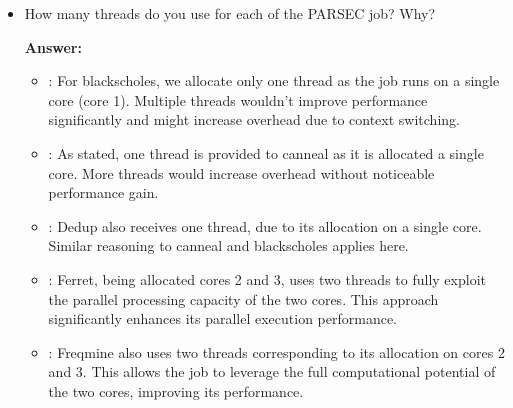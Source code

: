 \begin{enumerate}
\begin{itemize}
\begin{itemize}
        \item {}: Radix is assigned to cores 2 and 3, before ferret and freqmine started. Radix was observed to have a good response to parallelism and to be really fast. Additionally, ferret and freqmine run in around 10 minutes total. Thus, there was some time available once they had finished to run one of the other jobs. These times matched more closely to the execution time of radix.
        
        \item {}: Like blackscholes, canneal, and dedup, vips is allocated to core 1 sequentially. As an image processing system, vips requires high computational resources, but according to the analysis in Part 1-2 is less intensive than ferret or freqmine and, therefore, is allocated only one core.
 
    \end{itemize}


    \item How many threads do you use for each of the PARSEC job? Why?
    
    \textbf{Answer:}
    \begin{itemize}
        \item {}: For blackscholes, we allocate only one thread as the job runs on a single core (core 1). Multiple threads wouldn't improve performance significantly and might increase overhead due to context switching.
        
        \item {}: As stated, one thread is provided to canneal as it is allocated a single core. More threads would increase overhead without noticeable performance gain.
        
        \item {}: Dedup also receives one thread, due to its allocation on a single core. Similar reasoning to canneal and blackscholes applies here.
        
        \item {}: Ferret, being allocated cores 2 and 3, uses two threads to fully exploit the parallel processing capacity of the two cores. This approach significantly enhances its parallel execution performance.
        
        \item {}: Freqmine also uses two threads corresponding to its allocation on cores 2 and 3. This allows the job to leverage the full computational potential of the two cores, improving its performance.
        

\end{itemize}
\end{itemize}
\end{enumerate}

